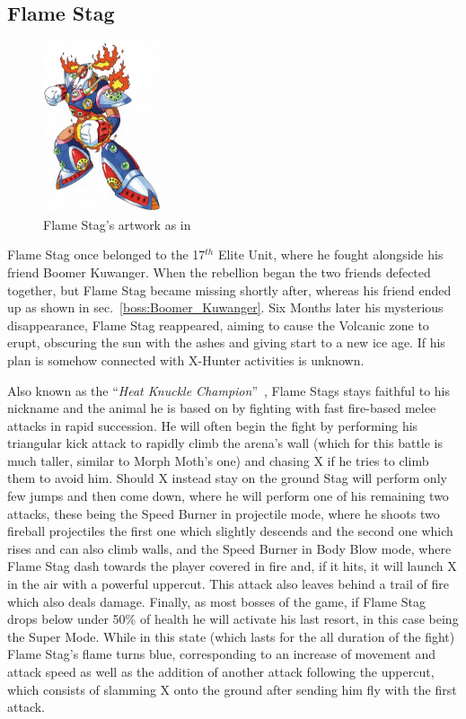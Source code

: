 \subsection{Flame Stag}\label{boss:Flame_stag}
\begin{figure}[htp]
	\centering
	\includegraphics[height=5cm]{figures/X2/Flame_stag/Flame_Stag.png}
	\caption{Flame Stag's artwork as in \cite{book:MMX_Complete_art}}
\end{figure}
Flame Stag once belonged to the 17$^{th}$ Elite Unit, where he fought alongside his friend Boomer Kuwanger.  When the rebellion began the two friends defected together, but Flame Stag became missing shortly after, whereas his friend ended up as shown in sec.~\ref{boss:Boomer_Kuwanger}. Six Months later his mysterious disappearance, Flame Stag reappeared, aiming to cause the Volcanic zone to erupt, obscuring the sun with the ashes and giving start to a new ice age. If his plan is somehow connected with X-Hunter activities is unknown.

Also known as the ``\textit{Heat Knuckle Champion}''~\cite{book:MMX_Complete_art}, Flame Stags stays faithful to his nickname and the animal he is based on by fighting with fast fire-based melee attacks in rapid succession. He will often begin the fight by performing his triangular kick attack to rapidly climb the arena's wall (which for this battle is much taller, similar to Morph Moth's one) and chasing X if he tries to climb them to avoid him. Should X instead stay on the ground Stag will perform only few jumps and then come down, where he will perform one of his remaining two attacks, these being the Speed Burner in projectile mode, where he shoots two fireball projectiles the first one which slightly descends and the second one which rises and can also climb walls, and the Speed Burner in Body Blow mode, where Flame Stag dash towards the player covered in fire and, if it hits, it will launch X in the air with a powerful uppercut. This attack also leaves behind a trail of fire which also deals damage. Finally, as most bosses of the game, if Flame Stag drops below under 50\% of health he will activate his last resort, in this case being the Super Mode. While in this state (which lasts for the all duration of the fight) Flame Stag's flame turns blue, corresponding to an increase of movement and attack speed as well as the addition of another attack following the uppercut, which consists of slamming X onto the ground after sending him fly with the first attack.


